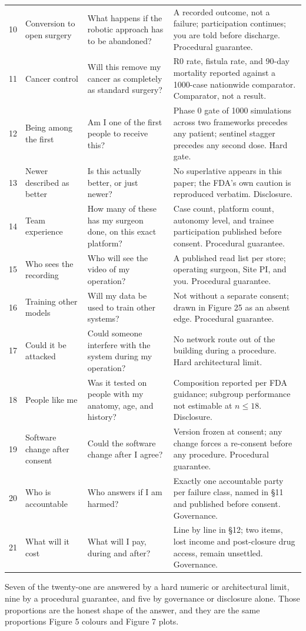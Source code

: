 \begin{xltabular}{\textwidth}{C{0.7cm} L{3.4cm} L{4.2cm} Y}
10 & Conversion to open surgery & What happens if the robotic approach has to be abandoned? & A recorded outcome, not a failure; participation continues; you are told before discharge. Procedural guarantee. \\
11 & Cancer control & Will this remove my cancer as completely as standard surgery? & R0 rate, fistula rate, and 90-day mortality reported against a 1000-case nationwide comparator. Comparator, not a result. \\
12 & Being among the first & Am I one of the first people to receive this? & Phase 0 gate of 1000 simulations across two frameworks precedes any patient; sentinel stagger precedes any second dose. Hard gate. \\
13 & Newer described as better & Is this actually better, or just newer? & No superlative appears in this paper; the FDA's own caution is reproduced verbatim. Disclosure. \\
14 & Team experience & How many of these has my surgeon done, on this exact platform? & Case count, platform count, autonomy level, and trainee participation published before consent. Procedural guarantee. \\
15 & Who sees the recording & Who will see the video of my operation? & A published read list per store; operating surgeon, Site PI, and you. Procedural guarantee. \\
16 & Training other models & Will my data be used to train other systems? & Not without a separate consent; drawn in Figure 25 as an absent edge. Procedural guarantee. \\
17 & Could it be attacked & Could someone interfere with the system during my operation? & No network route out of the building during a procedure. Hard architectural limit. \\
18 & People like me & Was it tested on people with my anatomy, age, and history? & Composition reported per FDA guidance; subgroup performance not estimable at $n \leq 18$. Disclosure. \\
19 & Software change after consent & Could the software change after I agree? & Version frozen at consent; any change forces a re-consent before any procedure. Procedural guarantee. \\
20 & Who is accountable & Who answers if I am harmed? & Exactly one accountable party per failure class, named in \S 11 and published before consent. Governance. \\
21 & What will it cost & What will I pay, during and after? & Line by line in \S 12; two items, lost income and post-closure drug access, remain unsettled. Governance. \\
\end{xltabular}

\vspace{0.30em}

\noindent Seven of the twenty-one are answered by a hard numeric or
architectural limit, nine by a procedural guarantee, and five by governance or
disclosure alone. Those proportions are the honest shape of the answer, and they
are the same proportions Figure 5 colours and Figure 7 plots.
